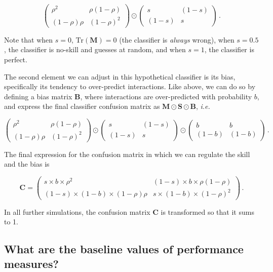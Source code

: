 \documentclass[11pt]{article}
\begin{document}
\[
\begin{pmatrix}
    \rho^2 & \rho (1-\rho) \\
    (1-\rho) \rho & (1-\rho)^2
\end{pmatrix} \odot \begin{pmatrix}
    s & (1-s) \\
    (1-s) & s
\end{pmatrix} \,.
\]

Note that when \(s=0\), \(\text{Tr}(\mathbf{M}) = 0\) (the classifier is
\emph{always} wrong), when \(s=0.5\), the classifier is no-skill and
guesses at random, and when \(s=1\), the classifier is perfect.

The second element we can adjust in this hypothetical classifier is its
bias, specifically its tendency to over-predict interactions. Like
above, we can do so by defining a bias matrix \(\mathbf{B}\), where
interactions are over-predicted with probability \(b\), and express the
final classifier confusion matrix as
\(\mathbf{M}\odot \mathbf{S}\odot \mathbf{B}\), \emph{i.e.}

\[
\begin{pmatrix}
    \rho^2 & \rho (1-\rho) \\
    (1-\rho) \rho & (1-\rho)^2
\end{pmatrix} \odot \begin{pmatrix}
    s & (1-s) \\
    (1-s) & s
\end{pmatrix} \odot \begin{pmatrix}
    b & b \\
    (1-b) & (1-b)
\end{pmatrix}\,.
\]

The final expression for the confusion matrix in which we can regulate
the skill and the bias is

\[
\mathbf{C} = \begin{pmatrix}
    s\times b\times \rho^2 & (1-s)\times b\times \rho (1-\rho) \\
    (1-s)\times (1-b)\times (1-\rho) \rho & s\times (1-b)\times (1-\rho)^2
\end{pmatrix} \,.
\]

In all further simulations, the confusion matrix \(\mathbf{C}\) is
transformed so that it sums to 1.

\hypertarget{what-are-the-baseline-values-of-performance-measures}{%
\subsection{What are the baseline values of performance
measures?}\label{what-are-the-baseline-values-of-performance-measures}}
\end{document}

